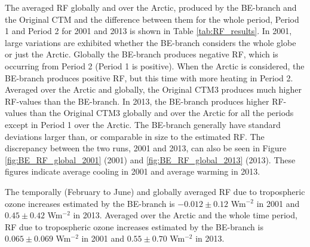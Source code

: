 The averaged RF globally and over the Arctic, produced by the BE-branch and the Original CTM and the difference between them for the whole period, Period 1 and Period 2 for 2001 and 2013 is shown in Table \ref{tab:RF_results}. In 2001, large variations are exhibited whether the BE-branch considers the whole globe or just the Arctic. Globally the BE-branch produces negative RF, which is occurring from Period 2 (Period 1 is positive). When the Arctic is considered, the BE-branch produces positive RF, but this time with more heating in Period 2. Averaged over the Arctic and globally, the Original CTM3 produces much higher RF-values than the BE-branch. In 2013, the BE-branch produces higher RF-values than the Original CTM3 globally and over the Arctic for all the periods except in Period 1 over the Arctic. The BE-branch generally have standard deviations larger than, or comparable in size to the estimated RF. The discrepancy between the two runs, 2001 and 2013, can also be seen in Figure \ref{fig:BE_RF_global_2001} (2001) and \ref{fig:BE_RF_global_2013} (2013). These figures indicate average cooling in 2001 and average warming in 2013.

\medskip

The temporally (February to June) and globally averaged RF due to tropospheric ozone increases estimated by the BE-branch is $-0.012\pm0.12$ Wm$^{-2}$ in 2001 and $0.45\pm0.42$ Wm$^{-2}$ in 2013. Averaged over the Arctic and the whole time period, RF due to tropospheric ozone increases estimated by the BE-branch is $0.065\pm0.069$ Wm$^{-2}$ in 2001 and $0.55\pm0.70$ Wm$^{-2}$ in 2013.










